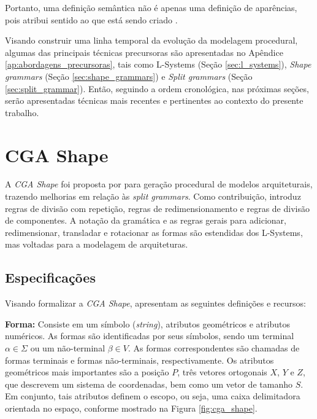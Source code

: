 Portanto, uma definição semântica não é apenas uma definição de aparências, pois atribui sentido ao que está sendo criado \cite{musse2015}.

Visando construir uma linha temporal da evolução da modelagem procedural, algumas das principais técnicas precursoras são apresentadas no Apêndice \ref{ap:abordagens_precursoras}, tais como \gls{L-Systems} (Seção \ref{sec:l_systems}), \textit{Shape grammars} (Seção \ref{sec:shape_grammars}) e \textit{Split grammars} (Seção \ref{sec:split_grammar}). Então, seguindo a ordem cronológica, nas próximas seções, serão apresentadas técnicas mais recentes e pertinentes ao contexto do presente trabalho.

\section{CGA Shape}
\label{sec:cga}

A \textit{CGA Shape} foi proposta por  para geração procedural de modelos arquiteturais, trazendo melhorias em relação às \textit{split grammars}. Como contribuição, introduz regras de divisão com repetição, regras de redimensionamento e regras de divisão de componentes. A notação da gramática e as regras gerais para adicionar, redimensionar, transladar e rotacionar as formas são estendidas dos \gls{L-Systems}, mas voltadas para a modelagem de arquiteturas.

\subsection{Especificações}
\label{sec:cga_especificacoes}

Visando formalizar a \textit{CGA Shape},  apresentam as seguintes definições e recursos:

\textbf{Forma:} Consiste em um símbolo (\textit{string}), atributos geométricos e atributos numéricos. As formas são identificadas por seus símbolos, sendo um terminal $\alpha \in \Sigma$ ou um não-terminal $\beta \in V$. As formas correspondentes são chamadas de formas terminais e formas não-terminais, respectivamente. Os atributos geométricos mais importantes são a posição $P$, três vetores ortogonais $X$, $Y$ e $Z$, que descrevem um sistema de coordenadas, bem como um vetor de tamanho $S$. Em conjunto, tais atributos definem o escopo, ou seja, uma caixa delimitadora orientada no espaço, conforme mostrado na Figura \ref{fig:cga_shape}.

